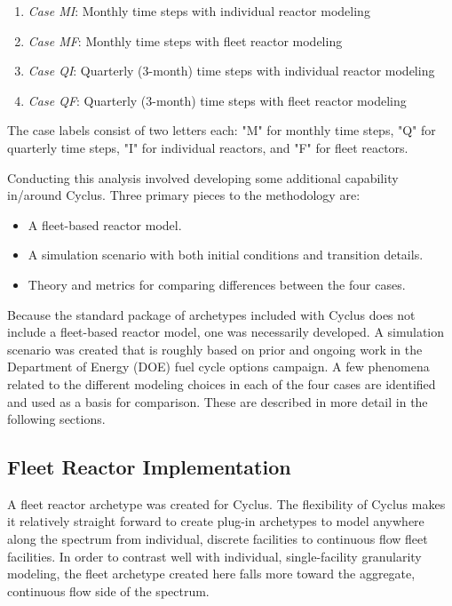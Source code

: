 \documentclass{style}
\begin{document}
\begin{enumerate}

    \item \emph{Case MI}: Monthly time steps with individual reactor modeling
    \item \emph{Case MF}: Monthly time steps with fleet reactor modeling
    \item \emph{Case QI}: Quarterly (3-month) time steps with individual reactor modeling
    \item \emph{Case QF}: Quarterly (3-month) time steps with fleet reactor modeling

\end{enumerate}

The case labels consist of two letters each: "M" for monthly time steps, "Q"
for quarterly time steps, "I" for individual reactors, and "F" for fleet
reactors.

Conducting this analysis involved developing some additional capability
in/around Cyclus.  Three primary pieces to the methodology are:

\begin{itemize}

    \item A fleet-based reactor model.

    \item A simulation scenario with both initial conditions and transition
        details.

    \item Theory and metrics for comparing differences between the four cases.

\end{itemize}

Because the standard package of archetypes included with Cyclus does not
include a fleet-based reactor model, one was necessarily developed. A
simulation scenario was created that is roughly based on prior and ongoing
work in the Department of Energy (DOE) fuel cycle options campaign.  A few
phenomena related to the different modeling choices in each of the four cases
are identified and used as a basis for comparison.  These are
described in more detail in the following sections.

\subsection{Fleet Reactor Implementation}

A fleet reactor archetype was created for Cyclus.  The flexibility of Cyclus
makes it relatively straight forward to create plug-in archetypes to model
anywhere along the spectrum from individual, discrete facilities to
continuous flow fleet facilities.  In order to contrast well with individual,
single-facility granularity modeling, the fleet archetype created here falls more
toward the aggregate, continuous flow side of the spectrum.  
\end{document}
